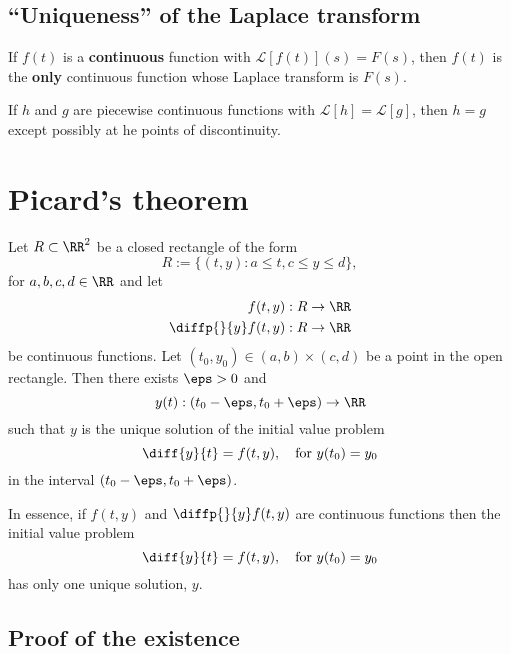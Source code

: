 \documentclass[12pt, a4paper]{article}
\newcommand{\CL}{\mathcal{L}}
\begin{document}
\subsection{``Uniqueness'' of the Laplace transform}

\begin{mdthm}
    If \(f(t)\) is a \textbf{continuous} function with \(\CL[f(t)](s)=F(s)\), then \(f(t)\) is the \textbf{only} continuous function whose Laplace transform is \(F(s)\).
\end{mdthm}

\begin{theorem}
    If \(h\) and \(g\) are piecewise continuous functions with \(\CL[h] = \CL[g]\), then \(h=g\) except possibly at he points of discontinuity.
\end{theorem}

\pagebreak

\section{Picard's theorem}

\begin{mdthm}
    Let \(R \subset \RR^2\) be a closed rectangle of the form 
    \[R := \{(t,y) : a \leq t, c \leq y \leq d\},\]
    for \(a,b,c,d \in \RR\) and let 
    \[\begin{aligned}
        f(t,y) &: R \to \RR \\
        \diffp{}{y}f(t,y) &: R \to \RR
    \end{aligned}\]
    be continuous functions. Let \((t_0,y_0) \in (a,b) \times (c,d)\) be a point in the open rectangle. Then there exists \(\eps>0\) and 
    \[y(t) : (t_0-\eps,t_0+\eps) \to \RR\]
    such that \(y\) is the unique solution of the initial value problem 
    \[\diff{y}{t}=f(t,y), \quad \text{for } y(t_0)=y_0\]
    in the interval \((t_0 - \eps,t_0 +\eps)\).
\end{mdthm}

\begin{mdnote}
    In essence, if \(f(t,y)\) and \(\diffp{}{y}f(t,y)\) are continuous functions then the initial value problem 
    \[\diff{y}{t}=f(t,y), \quad \text{for } y(t_0)=y_0\]
    has only one unique solution, \(y\).
\end{mdnote}

\subsection{Proof of the existence}
\end{document}
